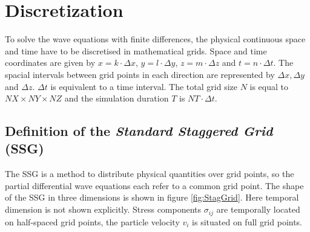 \documentclass[pdftex,a4paper,parskip,listof=totoc,bibliography=totoc,onehalfspacing,12pt]{scrreprt}
\begin{document}
\chapter{Discretization}

To solve the wave equations with finite differences, the physical continuous space and time have to be discretised in mathematical grids. Space and time coordinates are given by $x=k \cdot \Delta x$, $y=l \cdot \Delta y$, $z=m \cdot \Delta z$ and $t=n \cdot \Delta t$. The spacial intervals between grid points in each direction are represented by $\Delta x, \Delta y$ and $\Delta z$. $\Delta t$ is equivalent to a time interval. The total grid size $N$ is equal to $NX \times NY \times NZ$ and the simulation duration $T$ is $NT \cdot \Delta t$.

\section{Definition of the \textit{Standard Staggered Grid} (SSG)} \label{sec:SSG}

The SSG \citep{virieux:86,levander:88} is a method to distribute physical quantities over grid points, so the partial differential wave equations each refer to a common grid point. The shape of the SSG in three dimensions is shown in figure \ref{fig:StagGrid}. Here temporal dimension is not shown explicitly. Stress components $\sigma_{ij}$ are temporally located on half-spaced grid points, the particle velocity $v_{i}$ is situated on full grid points.
\end{document}
